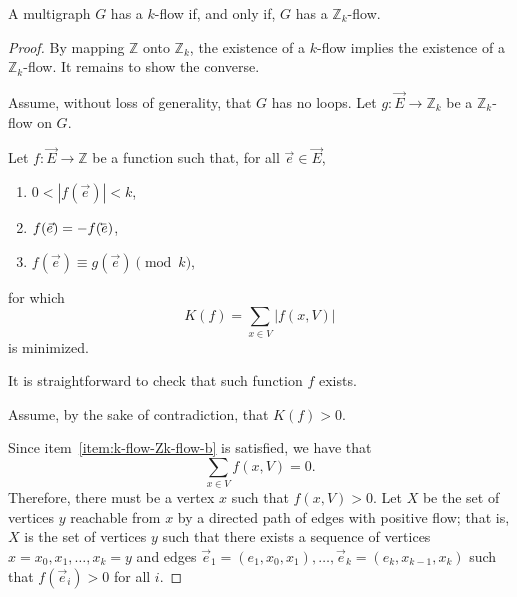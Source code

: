 \begin{theorem}[Tutte (1950)] \label{thm:k-flow-Zk-flow}
	A multigraph \(G\) has a \(k\)-flow if, and only if, \(G\) has a \(\mathbb{Z}_k\)-flow.
\end{theorem}

\begin{proof}
	By mapping \(\mathbb{Z}\) onto \(\mathbb{Z}_k\), the existence of a \(k\)-flow implies the existence of a \(\mathbb{Z}_k\)-flow. It remains to show the converse.

	Assume, without loss of generality, that \(G\) has no loops.
	Let \(g \colon \vec{E} \to \mathbb{Z}_k\) be a \(\mathbb{Z}_k\)-flow on \(G\).

	Let \(f \colon \vec{E} \to \mathbb{Z}\) be a function such that, for all \(\vec{e} \in \vec{E}\),
	\begin{enumerate}
		\item \(0 < |f(\vec{e})| < k\),
		\label{item:k-flow-Zk-flow-a}
		\item \(f(\vec{e}) = -f(\cev{e})\),
		\label{item:k-flow-Zk-flow-b}
		\item \(f(\vec{e}) \equiv g(\vec{e}) \pmod{k}\),
		\label{item:k-flow-Zk-flow-c}
	\end{enumerate}
	for which 
	\begin{equation}
		K(f) = \sum_{x \in V} |f(x, V)|
	\end{equation}
	is minimized.

	It is straightforward to check that such function \(f\) exists.

	Assume, by the sake of contradiction, that \(K(f) > 0\).

	Since item~\ref{item:k-flow-Zk-flow-b} is satisfied, we have that
	\begin{equation}
		\sum_{x \in V} f(x, V) = 0.
	\end{equation}
	Therefore, there must be a vertex \(x\) such that \(f(x, V) > 0\).
	Let \(X\) be the set of vertices \(y\) reachable from \(x\) by a directed path of edges with positive flow;
	that is, \(X\) is the set of vertices \(y\) such that there exists a sequence of vertices \(x = x_0, x_1, \ldots, x_k = y\) and edges \(\vec{e}_1 = (e_1, x_0, x_1), \ldots, \vec{e}_k = (e_k, x_{k-1}, x_k)\) such that \(f(\vec{e}_i) > 0\) for all \(i\).


\end{proof}
